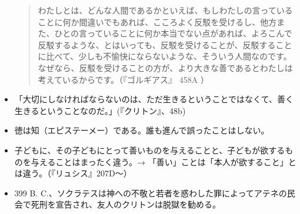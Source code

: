 \documentclass{jsarticle}
\begin{document}
\begin{itemize}
  \begin{quote}
     わたしとは、どんな人間であるかといえば、もしわたしの言っていることに何か間違いでもあれば、こころよく反駁を受けるし、他方また、ひとの言っていることに何か本当でない点があれば、よろこんで反駁するような、とはいっても、反駁を受けることが、反駁することに比べて、少しも不愉快にならないような、そういう人間なのです。なぜなら、反駁を受けることの方が、より大きな善であるとわたしは考えているからです。（『ゴルギアス』 458A ）
  \end{quote}

\item 「大切にしなければならないのは、ただ生きるということではなくて、善く生きるということなのだ。」(『クリトン』、48b)

\item 徳は知（エピステーメー）である。誰も進んで誤ったことはしない。

\item 子どもに、その子どもにとって善いものを与えることと、子どもが欲するものを与えることはまったく違う。→ 「善い」ことは「本人が欲すること」とは違う。（『リュシス』207D〜）

\item 399 B. C.、ソクラテスは神への不敬と若者を惑わした罪によってアテネの民会で死刑を宣告され、友人のクリトンは脱獄を勧める。

\end{itemize}
\end{document}
